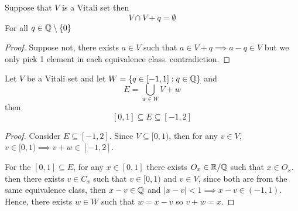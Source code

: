 \begin{lemma}\label{lem:vitali}
  Suppose that $V$ is a Vitali set then 
  \[V \cap V+q = \emptyset\] 
  For all $q \in \mathbb Q \setminus \{0\}$
\end{lemma}

\begin{proof}
  Suppose not, there exists $a \in V$ such that $a \in V + q\implies a-q \in V$ 
  but we only pick 1 element in each equivalence class. contradiction.  
\end{proof}

\begin{lemma}\label{lem:VW}
  Let $V$ be a Vitali set and let $W = \{q \in [-1, 1] : q \in \mathbb Q\}$ and 
  \[ E = \bigcup_{w \in W}V + w\]
   then 
  \[[0, 1] \subseteq E \subseteq [-1, 2]\]
\end{lemma}

\begin{proof}
  Consider $E \subseteq [-1, 2]$. Since $V \subseteq [0, 1)$, then
  for any $v \in V$, $v \in [0, 1) \implies v + w \in [-1, 2]$.

  For the $[0, 1] \subseteq E$,
  for any $x \in [0, 1]$ there exists $O_x \in \mathbb R/\mathbb Q$ such that $x \in O_x$.
  then there exists $v \in C_x$ such that $v \in [0, 1)$ and $v \in V$, since both
  are from the same equivalence class, then $x - v \in \mathbb Q$ and $|x - v| < 1 \implies x - v \in (-1, 1)$.
  Hence, there exists $w \in W$ such that $w = x-v$ so $v+w = x$.
\end{proof}


